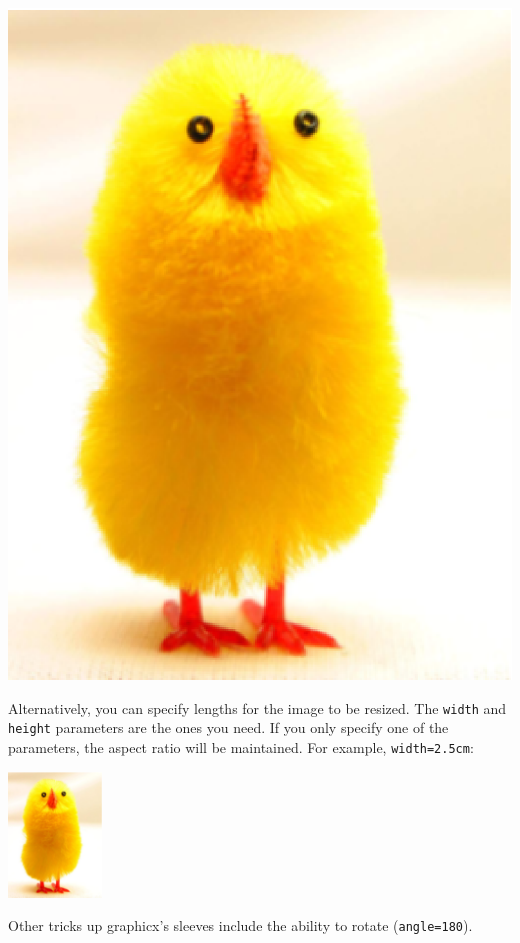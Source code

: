 \documentclass[english]{article}
\begin{document}
\begin{center}
  \includegraphics[scale=0.5]{chick}
\end{center}

Alternatively, you can specify lengths for the image to be resized.  The
\texttt{width} and \texttt{height} parameters are the ones you need.  If
you only specify one of the parameters, the aspect ratio will be
maintained.  For example, \texttt{width=2.5cm}:
\begin{center}
  \includegraphics[width=2.5cm]{chick}
\end{center}

Other tricks up graphicx's sleeves include the ability to rotate
(\texttt{angle=180}).
\end{document}
